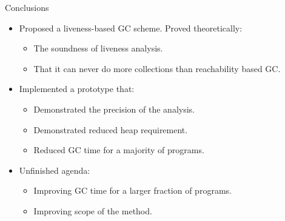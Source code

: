 \documentclass[xcolor=x11names,compress,mathserif]{beamer}
\renewcommand{\(}{\begin{columns}}
\renewcommand{\)}{\end{columns}}
\newcommand{\<}[1]{\begin{column}{#1}}
\renewcommand{\>}{\end{column}}
\begin{document}
\begin{frame}{Conclusions}
  \begin{itemize}\itemsep1em
  \item Proposed a liveness-based GC scheme. Proved theoretically:
    \begin{itemize}
    \item The soundness of liveness analysis.
    \item That it can never do more collections than reachability
      based GC.
    \end{itemize}
    \item Implemented a prototype that:
      \begin{itemize}
      \item Demonstrated the precision of the analysis.
      \item Demonstrated reduced heap requirement.
      \item Reduced GC time for a majority of programs.
    \end{itemize}
    \item Unfinished agenda:
      \begin{itemize}
      \item Improving GC time for a larger fraction of programs.
      \item Improving scope of the method.
    \end{itemize}
  \end{itemize}

\end{frame}
\end{document}
